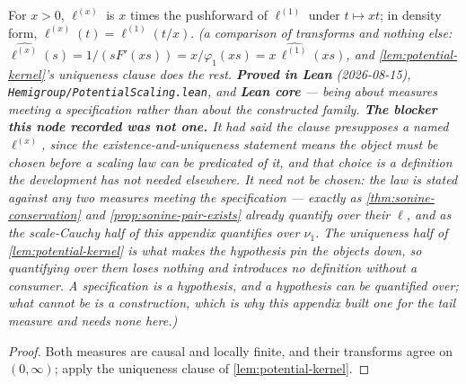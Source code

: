 \begin{lemma}\label{lem:potential-kernel-scaling}
\leanok
For $x > 0$, $\ell^{(x)}$ is $x$ times the pushforward of $\ell^{(1)}$ under $t \mapsto xt$; in
density form, $\ell^{(x)}(t) = \ell^{(1)}(t/x)$.
\statusT\quad\emph{(a comparison of transforms and nothing else:
$\widehat{\ell^{(x)}}(s) = 1/(sF'(xs)) = x/\varphi_1(xs) = x\,\widehat{\ell^{(1)}}(xs)$, and
\ref{lem:potential-kernel}'s uniqueness clause does the rest.
\textbf{Proved in Lean} (2026-08-15), \texttt{Hemigroup/PotentialScaling.lean}, and \textbf{Lean
core} --- being about measures meeting a specification rather than about the constructed
family.
\textbf{The blocker this node recorded was not one.} It had said the clause presupposes a
\emph{named} $\ell^{(x)}$, since the existence-and-uniqueness statement means the object must be
chosen before a scaling law can be predicated of it, and that choice is a definition the
development has not needed elsewhere. It need not be chosen: the law is stated against \emph{any
two} measures meeting the specification --- exactly as \ref{thm:sonine-conservation} and
\ref{prop:sonine-pair-exists} already quantify over their $\ell$, and as the scale-Cauchy half of this appendix quantifies
over $\nu_1$. The uniqueness half of \ref{lem:potential-kernel} is what makes the hypothesis pin
the objects down, so quantifying over them loses nothing and introduces no definition without a
consumer. \emph{A specification is a hypothesis, and a hypothesis can be quantified over}; what
cannot be is a construction, which is why this appendix built one for the tail measure and needs none
here.)}
\end{lemma}

\begin{proof}
\leanok
Both measures are causal and locally finite, and their transforms agree on $(0,\infty)$; apply the
uniqueness clause of \ref{lem:potential-kernel}.
\end{proof}
